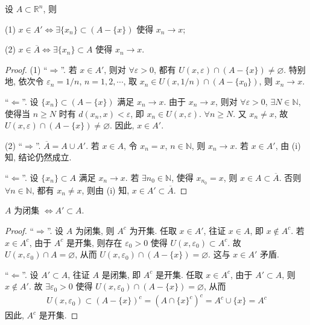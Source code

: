\documentclass[../../main.tex]{subfiles}
\begin{document}
\begin{proposition}\label{proposition:一个点在导集或闭包中的充要条件}
设 $A \subset \mathbb{R}^n$, 则

(1) $x \in A' \Leftrightarrow \exists \{x_n\} \subset (A - \{x\})$ 使得 $x_n \to x$;

(2) $x \in \overline{A} \Leftrightarrow \exists \{x_n\} \subset A$ 使得 $x_n \to x$.
\end{proposition}
\begin{proof}
(1) “$\Rightarrow$”. 若 $x \in A'$, 则对 $\forall \varepsilon > 0$, 都有 $U(x, \varepsilon) \cap (A - \{x\}) \neq \varnothing$. 特别地, 依次令 $\varepsilon_n = 1/n$, $n = 1, 2, \cdots$, 取 $x_n \in U(x, 1/n) \cap (A - \{x_0\})$, 则 $x_n \to x$.

“$\Leftarrow$”. 设 $\{x_n\} \subset (A - \{x\})$ 满足 $x_n \to x$. 由于 $x_n \to x$, 则对 $\forall \varepsilon > 0$, $\exists N \in \mathbb{N}$, 使得当 $n \geqslant N$ 时有 $d(x_n, x) < \varepsilon$, 即 $x_n \in U(x, \varepsilon)$. $\forall n \geqslant N$. 又 $x_n \neq x$, 故 $U(x, \varepsilon) \cap (A - \{x\}) \neq \varnothing$. 因此, $x \in A'$. 

(2) “$\Rightarrow$”. $\overline{A} = A \cup A'$. 若 $x \in A$, 令 $x_n = x$, $n \in \mathbb{N}$, 则 $x_n \to x$. 若 $x \in A'$, 由 (i) 知, 结论仍然成立.

“$\Leftarrow$”. 设 $\{x_n\} \subset A$ 满足 $x_n \to x$. 若 $\exists n_0 \in \mathbb{N}$, 使得 $x_{n_0} = x$, 则 $x \in A \subset \overline{A}$. 否则 $\forall n \in \mathbb{N}$, 都有 $x_n \neq x$, 则由 (i) 知, $x \in A' \subset \overline{A}$.

\end{proof}

\begin{theorem}
$A$ 为闭集 $\Leftrightarrow A' \subset A$.
\end{theorem}
\begin{proof}
“$\Rightarrow$”. 设 $A$ 为闭集, 则 $A^c$ 为开集. 任取 $x \in A'$, 往证 $x \in A$, 即 $x \notin A^c$. 若 $x \in A^c$, 由于 $A^c$ 是开集, 则存在 $\varepsilon_0 > 0$ 使得 $U(x, \varepsilon_0) \subset A^c$. 故 $U(x, \varepsilon_0) \cap A = \varnothing$, 从而 $U(x, \varepsilon_0) \cap (A - \{x\}) = \varnothing$. 这与 $x \in A'$ 矛盾.

“$\Leftarrow$”. 设 $A' \subset A$, 往证 $A$ 是闭集, 即 $A^c$ 是开集. 任取 $x \in A^c$, 由于 $A' \subset A$, 则 $x \notin A'$. 故 $\exists \varepsilon_0 > 0$ 使得 $U(x, \varepsilon_0) \cap (A - \{x\}) = \varnothing$, 从而
\begin{align*}
U(x, \varepsilon_0) \subset (A - \{x\})^c = (A \cap \{x\}^c)^c = A^c \cup \{x\} = A^c
\end{align*}
因此, $A^c$ 是开集.

\end{proof}
\end{document}
